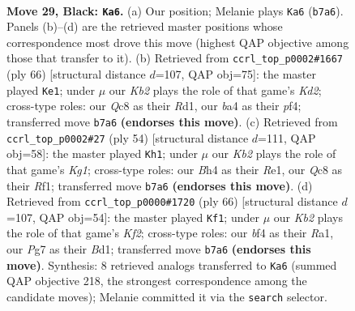 \documentclass[11pt]{article}
\begin{document}
\clearpage

\begin{figure}[p]\centering
\begin{subfigure}{0.46\textwidth}\centering
\resizebox{\linewidth}{!}{%
\newchessgame
\chessboard[
  setfen={r1q4r/pk3pp1/5n1p/5P1P/BQ3B1b/8/4K1p1/R5N1 b - - 5 29},
  showmover=false,
  pgfstyle=straightmove, color=movearrow, markmove={b7-a6}
]}
\caption{}
\end{subfigure}\hfill
\begin{subfigure}{0.46\textwidth}\centering
\resizebox{\linewidth}{!}{%
\newchessgame
\chessboard[
  setfen={2r4k/6bp/3p4/pp3N2/4PpP1/2PQ3P/q2K4/3R3R w - - 4 34},
  showmover=false,
  pgfstyle=straightmove, color=movearrow, markmove={d2-e1}
]}
\caption{}
\end{subfigure}
\\[4pt]
\begin{subfigure}{0.46\textwidth}\centering
\resizebox{\linewidth}{!}{%
\newchessgame
\chessboard[
  setfen={b5r1/3k1p2/Q7/2b3p1/5q2/5P1P/PP4P1/4RRK1 w - - 1 28},
  showmover=false,
  pgfstyle=straightmove, color=movearrow, markmove={g1-h1}
]}
\caption{}
\end{subfigure}\hfill
\begin{subfigure}{0.46\textwidth}\centering
\resizebox{\linewidth}{!}{%
\newchessgame
\chessboard[
  setfen={2r3k1/1p4p1/p2p2b1/P2P4/2P1p1P1/4Q3/1P1N1K1q/R2BR3 w - - 1 34},
  showmover=false,
  pgfstyle=straightmove, color=movearrow, markmove={f2-f1}
]}
\caption{}
\end{subfigure}
\caption{\textbf{Move 29, Black: \texttt{Ka6}.} (a) Our position; Melanie plays \texttt{Ka6} (\texttt{b7a6}). Panels (b)--(d) are the retrieved master positions whose correspondence most drove this move (highest QAP objective among those that transfer to it). (b) Retrieved from \texttt{ccrl\_top\_p0002\#1667} (ply 66) [structural distance $d$=107, QAP obj=75]: the master played \texttt{Ke1}; under $\mu$ our \emph{Kb2} plays the role of that game's \emph{Kd2}; cross-type roles: our \emph{Q}c8 as their \emph{R}d1, our \emph{b}a4 as their \emph{p}f4; transferred move \texttt{b7a6} \textbf{(endorses this move)}. (c) Retrieved from \texttt{ccrl\_top\_p0002\#27} (ply 54) [structural distance $d$=111, QAP obj=58]: the master played \texttt{Kh1}; under $\mu$ our \emph{Kb2} plays the role of that game's \emph{Kg1}; cross-type roles: our \emph{B}h4 as their \emph{R}e1, our \emph{Q}c8 as their \emph{R}f1; transferred move \texttt{b7a6} \textbf{(endorses this move)}. (d) Retrieved from \texttt{ccrl\_top\_p0000\#1720} (ply 66) [structural distance $d$=107, QAP obj=54]: the master played \texttt{Kf1}; under $\mu$ our \emph{Kb2} plays the role of that game's \emph{Kf2}; cross-type roles: our \emph{b}f4 as their \emph{R}a1, our \emph{P}g7 as their \emph{B}d1; transferred move \texttt{b7a6} \textbf{(endorses this move)}. Synthesis: 8 retrieved analogs transferred to \texttt{Ka6} (summed QAP objective 218, the strongest correspondence among the candidate moves); Melanie committed it via the \texttt{search} selector.}
\label{fig:thought-m57}
\end{figure}
\end{document}
